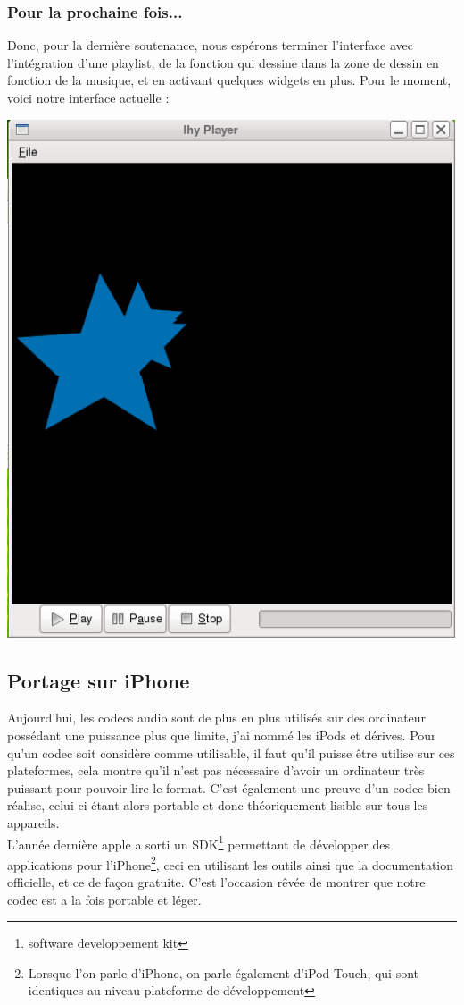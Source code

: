 \documentclass[a4paper,12pt]{article}
\begin{document}
	\subsubsection{Pour la prochaine fois...}
Donc, pour la dernière soutenance, nous espérons terminer l'interface avec
l'intégration d'une playlist, de la fonction qui dessine dans la zone de
dessin en fonction de la musique, et en activant quelques widgets en plus. Pour
le moment, voici notre interface actuelle :
\begin{center}
\includegraphics[scale=0.50]{img/Player.png}
\end{center}

\newpage

	\subsection{Portage sur iPhone}
Aujourd'hui, les codecs audio sont de plus en plus utilisés sur des
ordinateur possédant une puissance plus que limite, j'ai nommé les iPods
et dérives. Pour qu'un codec soit considère comme utilisable, il faut
qu'il puisse être utilise sur ces plateformes, cela montre qu'il n'est
pas nécessaire d'avoir un ordinateur très puissant pour pouvoir lire le
format. C'est également une preuve d'un codec bien réalise, celui ci
étant alors portable et donc théoriquement lisible sur tous les
appareils.\\
L'année dernière apple a sorti un SDK\footnote{software developpement
kit} permettant de développer des applications pour l'iPhone\footnote{Lorsque
l'on parle d'iPhone, on parle également d'iPod Touch, qui sont identiques au
niveau plateforme de développement}, ceci en
utilisant les outils ainsi que la documentation officielle, et ce de façon gratuite.
C'est l'occasion rêvée de montrer que notre codec est a la fois
portable et léger.\\
\end{document}

